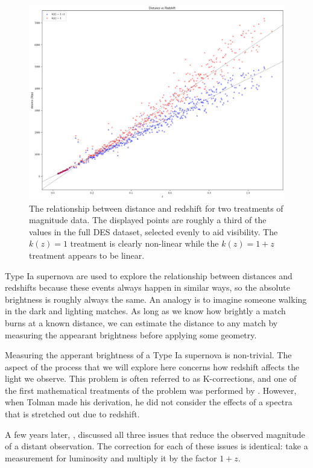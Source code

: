 \documentclass{article}
\begin{document}
\begin{figure}[h]
  \includegraphics[width=\linewidth]{mu_distance_vs_redshift.png}
  \caption{The relationship between distance and redshift for two treatments of
  magnitude data. The displayed points are roughly a third of the values in the
  full DES dataset, selected evenly to aid visibility. The $k(z) = 1$ treatment
  is clearly non-linear while the $k(z) = 1 + z$ treatment appears to be
  linear.}
  \label{fig:mu_distance_vs_redshift}
\end{figure}

Type Ia supernova are used to explore the relationship between distances and
redshifts because these events always happen in similar ways, so the absolute
brightness is roughly always the same. An analogy is to imagine someone walking
in the dark and lighting matches. As long as we know how brightly a match burns
at a known distance, we can estimate the distance to any match by measuring the
appearant brightness before applying some geometry.

Measuring the apperant brightness of a Type Ia supernova is non-trivial. The
aspect of the process that we will explore here concerns how redshift affects
the light we observe. This problem is often referred to as K-corrections, and
one of the first mathematical treatments of the problem was performed by
\citet{tolman1930}. However, when Tolman made his derivation, he did not
consider the effects of a spectra that is stretched out due to redshift.

A few years later, \citet{desitter1934}, discussed all three issues that reduce
the observed magnitude of a distant observation. The correction for each of
these issues is identical: take a measurement for luminosity and multiply it by
the factor $1 + z$.
\end{document}
